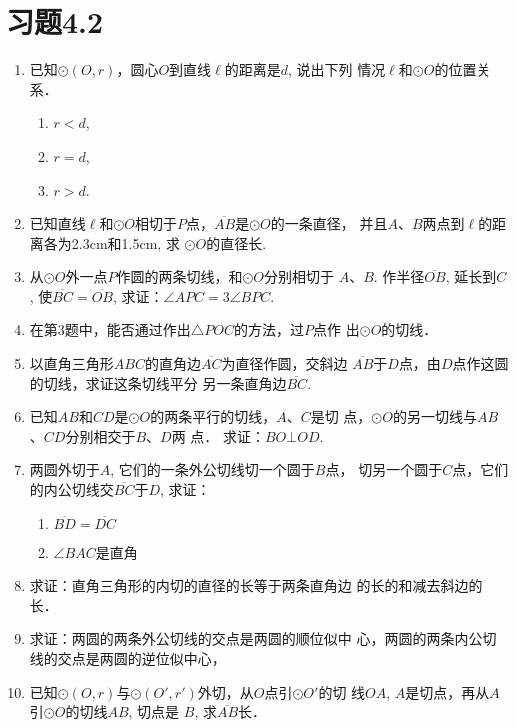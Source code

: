 \section*{习题4.2}
\begin{enumerate}
    \item 已知$\odot(O,r)$，圆心$O$到直线$\ell$的距离是$d$, 说出下列
    情况$\ell$和$\odot O$的位置关系．
\begin{multicols}{3}
    \begin{enumerate}
        \item $r<d$,
        \item $r=d$,
        \item $r>d$.
    \end{enumerate}
\end{multicols}

    \item 已知直线$\ell$和$\odot O$相切于$P$点，$\overline{AB}$是$\odot O$的一条直径，
    并且$A$、$B$两点到$\ell$的距离各为2.3cm和1.5cm, 求
    $\odot O$的直径长.
    \item 从$\odot O$外一点$P$作圆的两条切线，和$\odot O$分别相切于
$A$、$B$. 作半径$\overline{OB}$, 延长到$C$, 使$\overline{BC}=\overline{OB}$, 
求证：$\angle APC=3\angle BPC$.
\item 在第3题中，能否通过作出$\triangle POC$的方法，过$P$点作
出$\odot O$的切线．
\item 以直角三角形$ABC$的直角边$\overline{AC}$为直径作圆，交斜边
$\overline{AB}$于$D$点，由$D$点作这圆的切线，求证这条切线平分
另一条直角边$\overline{BC}$.
\item 已知$AB$和$CD$是$\odot O$的两条平行的切线，$A$、$C$是切
点，$\odot O$的另一切线与$AB$、$CD$分别相交于$B$、$D$两
点．
求证：$BO\bot OD$.
\item 两圆外切于$A$, 它们的一条外公切线切一个圆于$B$点，
切另一个圆于$C$点，它们的内公切线交$\overline{BC}$于$D$, 求证：
\begin{multicols}{2}
    \begin{enumerate}
        \item $\overline{BD}=\overline{DC}$
        \item $\angle BAC$是直角
    \end{enumerate}
\end{multicols}

\item 求证：直角三角形的内切的直径的长等于两条直角边
的长的和减去斜边的长．
\item 求证：两圆的两条外公切线的交点是两圆的顺位似中
心，两圆的两条内公切线的交点是两圆的逆位似中心，
\item 已知$\odot (O,r)$与$\odot (O',r')$外切，从$O$点引$\odot O'$的切
线$OA$, $A$是切点，再从$A$引$\odot O$的切线$AB$, 切点是
$B$, 求$\overline{AB}$长．
\end{enumerate}


